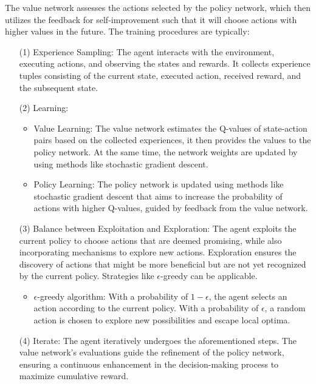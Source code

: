 \documentclass[conference]{IEEEtran}
\begin{document}
The value network assesses the actions selected by the policy network, which then utilizes the feedback for self-improvement such that it will choose actions with higher values in the future. The training procedures are typically:
\begin{itemize}
    \item[(1)] Experience Sampling: The agent interacts with the environment, executing actions, and observing the states and rewards. It collects experience tuples consisting of the current state, executed action, received reward, and the subsequent state.
    \item[(2)] Learning:
    \begin{itemize}
        \item Value Learning: The value network estimates the Q-values of state-action pairs based on the collected experiences, it then provides the values to the policy network. At the same time, the network weights are updated by using methods like stochastic gradient descent. 
        \item Policy Learning: The policy network is updated using methods like stochastic gradient descent that aims to increase the probability of actions with higher Q-values, guided by feedback from the value network.
    \end{itemize}
    
    \item[(3)] Balance between Exploitation and Exploration: The agent exploits the current policy to choose actions that are deemed promising, while also incorporating mechanisms to explore new actions. Exploration ensures the discovery of actions that might be more beneficial but are not yet recognized by the current policy. Strategies like $\epsilon$-greedy can be applicable.
    
    \begin{itemize}
        \item $\epsilon$-greedy algorithm: With a probability of $1-\epsilon$, the agent selects an action according to the current policy. With a probability of $\epsilon$, a random action is chosen to explore new possibilities and escape local optima.
    \end{itemize}
    
    \item[(4)] Iterate: The agent iteratively undergoes the aforementioned steps. The value network's evaluations guide the refinement of the policy network, ensuring a continuous enhancement in the decision-making process to maximize cumulative reward.
\end{itemize}
\end{document}
